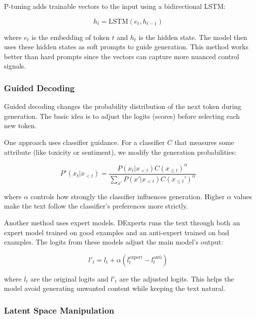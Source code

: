 P-tuning adds trainable vectors to the input using a bidirectional LSTM:

\begin{equation}
    h_t = \text{LSTM}(e_t, h_{t-1})
\end{equation}

where $e_t$ is the embedding of token $t$ and $h_t$ is the hidden state. The model then uses these hidden states as soft prompts to guide generation. This method works better than hard prompts since the vectors can capture more nuanced control signals.

\subsubsection{Guided Decoding}

Guided decoding changes the probability distribution of the next token during generation. The basic idea is to adjust the logits (scores) before selecting each new token.

One approach uses classifier guidance. For a classifier $C$ that measures some attribute (like toxicity or sentiment), we modify the generation probabilities:

\begin{equation}
    P'(x_t|x_{<t}) = \frac{P(x_t|x_{<t})C(x_{\leq t})^\alpha}{\sum_{x'} P(x'|x_{<t})C(x_{\leq t}')^\alpha}
\end{equation}

where $\alpha$ controls how strongly the classifier influences generation. Higher $\alpha$ values make the text follow the classifier's preferences more strictly.

Another method uses expert models. DExperts runs the text through both an expert model trained on good examples and an anti-expert trained on bad examples. The logits from these models adjust the main model's output:

\begin{equation}
    l'_t = l_t + \alpha(l^{\text{expert}}_t - l^{\text{anti}}_t)
\end{equation}

where $l_t$ are the original logits and $l'_t$ are the adjusted logits. This helps the model avoid generating unwanted content while keeping the text natural.

\subsubsection{Latent Space Manipulation}

